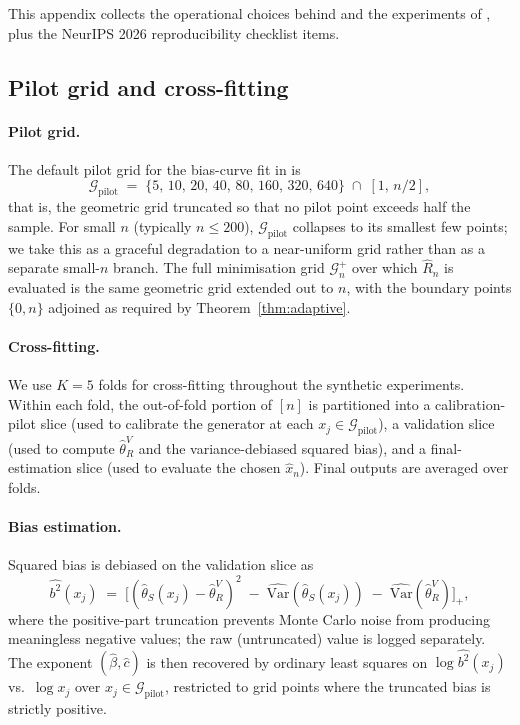 \label{app:impl}

This appendix collects the operational choices behind  and the experiments of , plus the NeurIPS 2026 reproducibility checklist items.

\subsection{Pilot grid and cross-fitting}\label{ssec:impl-grid}

\paragraph{Pilot grid.} The default pilot grid for the bias-curve fit in  is
\[
  \mathcal{G}_{\mathrm{pilot}}\;=\;\{5,\,10,\,20,\,40,\,80,\,160,\,320,\,640\}\;\cap\;[1,\,n/2],
\]
that is, the geometric grid truncated so that no pilot point exceeds half the sample. For small $n$ (typically $n\le 200$), $\mathcal{G}_{\mathrm{pilot}}$ collapses to its smallest few points; we take this as a graceful degradation to a near-uniform grid rather than as a separate small-$n$ branch. The full minimisation grid $\mathcal{G}_n^+$ over which $\widehat R_n$ is evaluated is the same geometric grid extended out to $n$, with the boundary points $\{0,n\}$ adjoined as required by Theorem~\ref{thm:adaptive}.

\paragraph{Cross-fitting.} We use $K=5$ folds for cross-fitting throughout the synthetic experiments. Within each fold, the out-of-fold portion of $[n]$ is partitioned into a calibration-pilot slice (used to calibrate the generator at each $x_j\in\mathcal{G}_{\mathrm{pilot}}$), a validation slice (used to compute $\hat\theta_R^V$ and the variance-debiased squared bias), and a final-estimation slice (used to evaluate the chosen $\hat x_n$). Final outputs are averaged over folds.

\paragraph{Bias estimation.} Squared bias is debiased on the validation slice as
\[
  \widehat{b^2}(x_j)\;=\;\bigl[(\hat\theta_S(x_j)-\hat\theta_R^V)^2\;-\;\widehat{\mathrm{Var}}(\hat\theta_S(x_j))\;-\;\widehat{\mathrm{Var}}(\hat\theta_R^V)\bigr]_+,
\]
where the positive-part truncation prevents Monte Carlo noise from producing meaningless negative values; the raw (untruncated) value is logged separately. The exponent $(\hat\beta,\hat c)$ is then recovered by ordinary least squares on $\log\widehat{b^2}(x_j)$ vs.\ $\log x_j$ over $x_j\in\mathcal{G}_{\mathrm{pilot}}$, restricted to grid points where the truncated bias is strictly positive.


